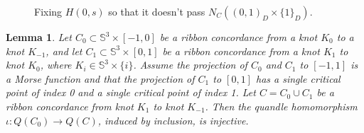 \documentclass[10pt,a4paper]{amsart}
\newtheorem{lemma}{Lemma}
\newcommand{\s}{\mathbb{S}}
\begin{document}
\begin{figure}[ht]
	\centering
	\hspace{1cm}
	
	\caption{Fixing $H(0,s)$ so that it doesn't pass $N_C((0,1)_D \times \{1\}_D)$.}
	\label{fig:conc_nbh}
\end{figure}

\begin{lemma}
	\label{lemma:ribon_conc_quandle}
	Let $C_0\subset \s ^{3}\times [-1, 0]$ be a ribbon concordance from a knot $K_{0}$ to a knot $K_{-1}$,
	and let $C_1 \subset \s^3 \times [0,1]$ be a ribbon concordance from a knot $K_1$ to knot $K_0$, 
	where $K_{i}\in \s ^{3}\times \{i\}$.
	Assume the projection of $C_0$ and $C_1$ to $[-1,1]$ is a Morse function and that the projection of $C_1$ to $[0,1]$ has a single critical point of index 0 and a single
	critical point of index 1. Let $C = C_0 \cup C_1$ be a ribbon concordance from knot $K_1$ to knot $K_{-1}$.
	Then the quandle homomorphism $\iota \colon Q(C_0)\to Q(C)$, induced by inclusion, is injective.
\end{lemma}
\end{document}
